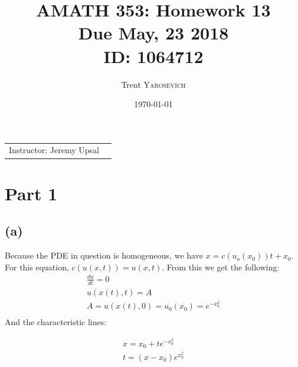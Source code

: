 \documentclass{article}
\title{AMATH 353: Homework 13 \\Due May, 23 2018 \\ ID: 1064712} %
\author{Trent \textsc{Yarosevich}} %
\date{\today} %
\begin{document}
\maketitle %
\setlength\parindent{1cm}

\begin{center}
\begin{tabular}{l r}
Instructor: Jeremy Upsal %
\end{tabular}
\end{center}


\section*{Part 1}
\subsection*{(a)}
Because the PDE in question is homogeneous, we have $x = c(u_o(x_0))t + x_0$. For this equation, $c(u(x,t)) = u(x, t)$. From this we get the following:
\begin{equation}
\begin{aligned}
\frac{du}{dt} = 0\\
u(x(t), t) = A\\
A = u(x(t),0) = u_0(x_0) = e^{-x_0^2}\\
\end{aligned}
\end{equation}
And the characteristic lines:
\begin{tcolorbox}[minipage,colback=white,arc=0pt,outer arc=0pt]
\begin{equation}
\begin{aligned}
x = x_0 + te^{-x_0^2}\\
t = (x - x_0)e^{x_0^2}
\end{aligned}
\end{equation}
\end{tcolorbox}
\end{document}

